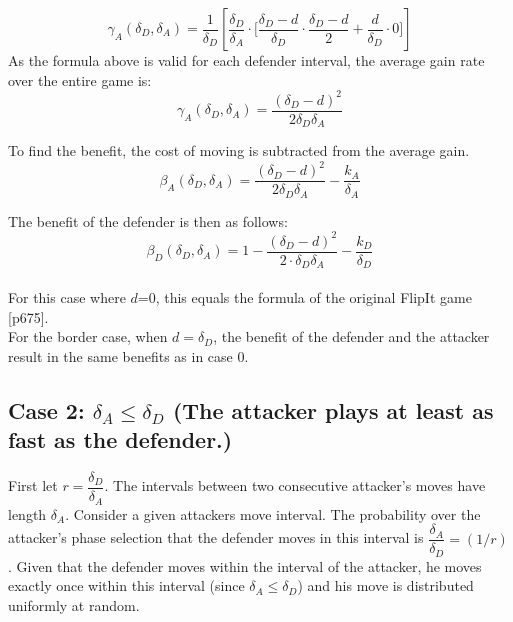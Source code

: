 \begin{equation*}
\gamma_{A}(\delta_{D},\delta_{A}) = \dfrac {1}{\delta_{D}} [ \dfrac{\delta_{D}}{\delta_{A}} \cdot \big[ \dfrac{\delta_{D}-d}{\delta_{D}} \cdot \dfrac{\delta_{D}-d}{2} + \dfrac{d}{\delta_{D}} \cdot 0 \big] ]
\end{equation*}
As the formula above is valid for each defender interval, the average gain rate over the entire game is:
\begin{equation*}
\gamma_{A}(\delta_{D},\delta_{A}) = \dfrac{(\delta_{D} -d)^{2}}{2\delta_{D}\delta_{A}}
\end{equation*}

To find the benefit, the cost of moving is subtracted from the average gain. 
\begin{equation}
\beta_{A}(\delta_{D},\delta_{A}) = \dfrac { (\delta_{D}-d) ^{2}} {2 \delta_{D}  \delta_{A}} - \dfrac{k_{A}}{\delta_{A}}
\label{Benfcase1:attacker}
\end{equation}

 
 The benefit of the defender is then as follows:
\begin{equation}
\beta_{D}(\delta_{D},\delta_{A}) = 1 - \dfrac { (\delta_{D}-d) ^{2}} {2 \cdot \delta_{D}  \delta_{A}} - \dfrac{k_{D}}{ \delta_{D}}
\label{Benfcase1:defender}
\end{equation}
~~\\
For this case where $d$=0, this equals the formula of the original FlipIt game \citep{FlipIt} [p675].\\
For the border case, when $d=\delta_{D}$, the benefit of the defender and the attacker result in the same benefits as in case 0.




\subsection*{\textbf{Case 2:} $\delta_{A} \leq \delta_{D} $ (The attacker plays at least as fast as the defender.) }

First let $r = \dfrac{\delta_{D}}{ \delta_{A} }$. The intervals between two consecutive attacker's moves have length $\delta_{A}$. Consider a given attackers move interval. The probability over the attacker's phase selection that the defender moves in this interval is $\dfrac{\delta_{A}}{ \delta_{D} } = (1/r)$. Given that the defender moves within the interval of the attacker, he moves exactly once within this interval (since $\delta_{A} \leq \delta_{D} $) and his move is distributed uniformly at random. \\

